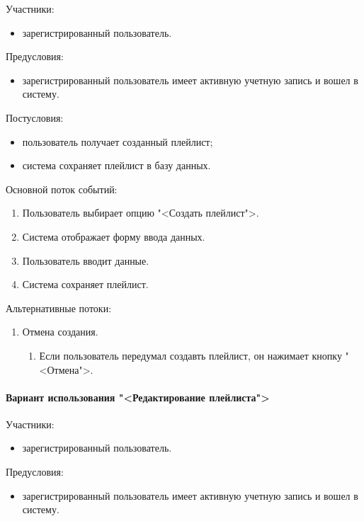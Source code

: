 Участники:
\begin{itemize}
	\item зарегистрированный пользователь.
\end{itemize}

Предусловия:
\begin{itemize}
	\item зарегистрированный пользователь имеет активную учетную запись и вошел в систему.
\end{itemize}

Постусловия:
\begin{itemize}
	\item пользователь получает созданный плейлист;
	\item система сохраняет плейлист в базу данных.
\end{itemize}

Основной поток событий:
\begin{enumerate}
	\item Пользователь выбирает опцию "<Создать плейлист">.
	\item Система отображает форму ввода данных.
	\item Пользователь вводит данные.
	\item Система сохраняет плейлист.
\end{enumerate}
	
Альтернативные потоки:
\begin{enumerate}
	\item Отмена создания.
	\begin{enumerate}
		\item Если пользователь передумал создавть плейлист, он нажимает кнопку "<Отмена">.
	\end{enumerate}
\end{enumerate}

\paragraph{Вариант использования "<Редактирование плейлиста">}


Участники:
\begin{itemize}
	\item зарегистрированный пользователь.
\end{itemize}

Предусловия:
\begin{itemize}
	\item зарегистрированный пользователь имеет активную учетную запись и вошел в систему.
\end{itemize}

